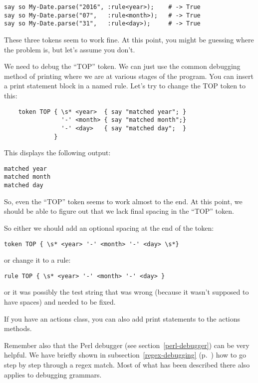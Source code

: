 \begin{verbatim}
say so My-Date.parse("2016", :rule<year>);    # -> True
say so My-Date.parse("07",   :rule<month>);   # -> True
say so My-Date.parse("31",   :rule<day>);     # -> True
\end{verbatim}

These three tokens seem to work fine. At this point, you 
might be guessing where the problem is, but let's assume 
you don't.

We need to debug the ``TOP'' token. We can just use the common 
debugging method of printing where we are at various stages 
of the program. You can insert a print statement block 
in a named rule. Let's try to change the TOP token to this:

\begin{verbatim}
    token TOP { \s* <year>  { say "matched year"; }
                '-' <month> { say "matched month";}
                '-' <day>   { say "matched day";  }
              }
\end{verbatim}
 
This displays the following output:

\begin{verbatim}
matched year
matched month
matched day
\end{verbatim}

So, even the ``TOP'' token seems to work almost to the end. At 
this point, we should be able to figure out that we lack 
final spacing in the ``TOP'' token. 

So either we should add an optional spacing at the end of 
the token:

\begin{verbatim}
token TOP { \s* <year> '-' <month> '-' <day> \s*}
\end{verbatim}

or change it to a rule:

\begin{verbatim}
rule TOP { \s* <year> '-' <month> '-' <day> }
\end{verbatim}

or it was possibly the test string that was wrong (because 
it wasn't supposed to have spaces) and needed to be fixed.

If you have an actions class, you can also add print statements 
to the actions methods.

Remember also that the Perl debugger (see 
section~\ref{perl-debugger}) can be very helpful. We have 
briefly shown in subsection~\ref{regex-debugging} 
(p.~\pageref{regex-debugging}) how to go step by step 
through a regex match. Most of what has been described 
there also applies to debugging grammars.

